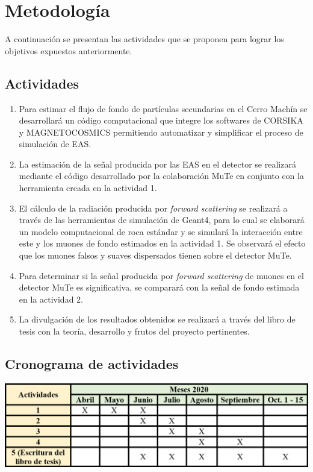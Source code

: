 \documentclass[12pt]{report}
\begin{document}
\section*{Metodología}

A continuación se presentan las actividades que se proponen para lograr los objetivos expuestos anteriormente.
\subsection*{Actividades}
\begin{enumerate}
    \item Para estimar el flujo de fondo de partículas secundarias en el Cerro Machín se desarrollará un código computacional que integre los softwares de CORSIKA y MAGNETOCOSMICS permitiendo automatizar y simplificar el proceso de simulación de EAS.
    \item La estimación de la señal producida por las EAS en el detector se realizará mediante el código desarrollado por la colaboración MuTe en conjunto con la herramienta creada en la actividad 1.
    \item El cálculo de la radiación producida por \textit{forward scattering} se realizará a través de las herramientas de simulación de Geant4, para lo cual se elaborará un modelo computacional de roca estándar y se simulará la interacción entre este y los muones de fondo estimados en la actividad 1. Se observará el efecto que los muones falsos y suaves dispersados tienen sobre el detector MuTe.
    \item Para determinar si la señal producida por \textit{forward scattering} de muones en el detector MuTe es significativa, se comparará con la señal de fondo estimada en la actividad 2.
    \item La divulgación de los resultados obtenidos se realizará a través del libro de tesis con la teoría, desarrollo y frutos del proyecto pertinentes.
\end{enumerate}

\subsection*{Cronograma de actividades}
\begin{center}
    \includegraphics[width=\textwidth]{images/cronograma.png}
\end{center}
\end{document}
